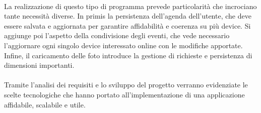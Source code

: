 \\
La realizzazione di questo tipo di programma prevede particolarità che incrociano tante necessità diverse.
In primis la persistenza dell'agenda dell'utente, che deve essere salvata e aggiornata per garantire affidabilità e coerenza su più device.
Si aggiunge poi l'aspetto della condivisione degli eventi, che vede necessario l'aggiornare ogni singolo device interessato online con le modifiche apportate.
Infine, il caricamento delle foto introduce la gestione di richieste e persistenza di dimensioni importanti.\\
\\
Tramite l'analisi dei requisiti e lo sviluppo del progetto verranno evidenziate le scelte tecnologiche che hanno portato all'implementazione di una applicazione affidabile, scalabile e utile.  


\newpage